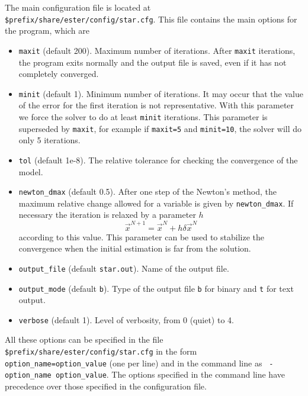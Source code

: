 The main configuration file is located at
\texttt{\$prefix/share/ester/config/star.cfg}.
This file contains the main options for the program, which are

\begin{itemize}
\item {\tt maxit} (default 200).
Maximum number of iterations. After {\tt maxit} iterations, the program
exits normally and the output file is saved, even if it has not completely converged.
\item {\tt minit} (default 1).
Minimum number of iterations. It may occur that the value of the error
for the first iteration is not representative. With this parameter we force the solver to
do at least {\tt minit} iterations. This parameter is superseded by {\tt maxit}, for example
if {\tt maxit=5} and {\tt minit=10}, the solver will do only 5 iterations.
\item {\tt tol} (default 1e-8). 
The relative tolerance for checking the convergence of the model.
\item {\tt newton\_dmax} (default 0.5).
After one step of the Newton's method, the maximum relative change
allowed for a variable is given by {\tt newton\_dmax}. If necessary the iteration is relaxed
by a parameter $h$
$$\vec x^{N+1}=\vec x^N+h \delta\vec x^N$$
according to this value.
This parameter can be used to stabilize the convergence when the initial estimation is far
from the solution.
\item {\tt output\_file} (default {\tt star.out}). Name of the output file.
\item {\tt output\_mode} (default {\tt b}). Type of the output file {\tt b} for binary
and {\tt t} for text output.
\item {\tt verbose} (default 1). Level of verbosity, from 0 (quiet) to 4.
\end{itemize}

All these options can be specified in the file 
\texttt{\$prefix/share/ester/config/star.cfg} in the form {\tt
option\_name=option\_value} (one per line) and in the command line as {\tt
-option\_name option\_value}.
The options specified in the command line have precedence over those specified
in the configuration file.

